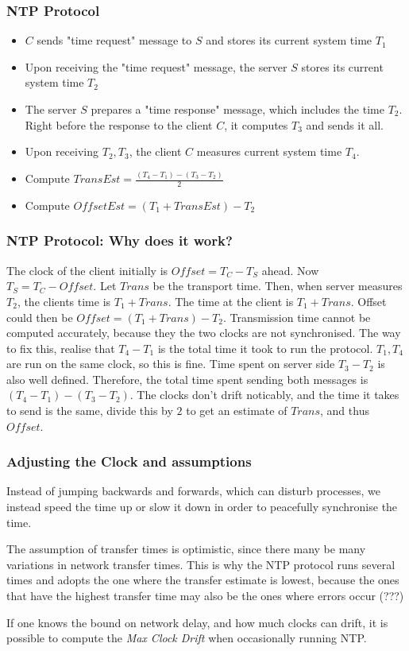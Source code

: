         \begin{frame}
            \frametitle{NTP Protocol}
                \begin{itemize}
                    \item $C$ sends "time request" message to $S$ and stores its current system time $T_1$
                    \item Upon receiving the "time request" message, the server $S$ stores its current system time $T_2$
                    \item The server $S$ prepares a "time response" message, which includes the time $T_2$. Right before the response to the client $C$, it computes $T_3$ and sends it all. 
                    \item Upon receiving $T_2, T_3$, the client $C$ measures current system time $T_4$. 
                    \item Compute $TransEst = \frac{(T_4 - T_1) - (T_3 - T_2)}{2}$
                    \item Compute $OffsetEst = (T_1 + TransEst) - T_2$             
                \end{itemize}
        \end{frame}
        \begin{frame}
            \frametitle{NTP Protocol: Why does it work?}
                The clock of the client initially is $Offset = T_C - T_S$ ahead. Now $T_S = T_C - Offset$. Let $Trans$ be the transport time. Then, when server measures $T_2$, the clients time is $T_1 + Trans$. The time at the client is $T_1 + Trans$. Offset could then be $Offset = (T_1 + Trans) - T_2$. Transmission time cannot be computed accurately, because they the two clocks are not synchronised. The way to fix this, realise that $T_4 - T_1$ is the total time it took to run the protocol. $T_1, T_4$ are run on the same clock, so this is fine. Time spent on server side $T_3 - T_2$ is also well defined. Therefore, the total time spent sending both messages is $(T_4 - T_1) - (T_3 - T_2)$. The clocks don't drift noticably, and the time it takes to send is the same, divide this by $2$ to get an estimate of $Trans$, and thus $Offset$. 
        \end{frame}
        \begin{frame}
            \frametitle{Adjusting the Clock and assumptions}
                 Instead of jumping backwards and forwards, which can disturb processes, we instead speed the time up or slow it down in order to 
                 peacefully synchronise the time. 

                 The assumption of transfer times is optimistic, since there many be many variations in network transfer times. This is why the NTP protocol runs several times and adopts the one where the transfer estimate is lowest, because the ones that have the highest transfer time may also be the ones where errors occur (???)

                 If one knows the bound on network delay, and how much clocks can drift, it is possible to compute the \textit{Max Clock Drift} when occasionally running NTP.
        \end{frame}
